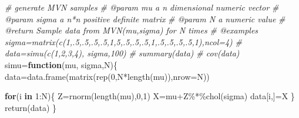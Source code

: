 \documentclass[
]{article}
\newenvironment{Shaded}{\begin{snugshade}}{\end{snugshade}}
\newcommand{\AttributeTok}[1]{\textcolor[rgb]{0.77,0.63,0.00}{#1}}
\newcommand{\CommentTok}[1]{\textcolor[rgb]{0.56,0.35,0.01}{\textit{#1}}}
\newcommand{\ControlFlowTok}[1]{\textcolor[rgb]{0.13,0.29,0.53}{\textbf{#1}}}
\newcommand{\DecValTok}[1]{\textcolor[rgb]{0.00,0.00,0.81}{#1}}
\newcommand{\FunctionTok}[1]{\textcolor[rgb]{0.00,0.00,0.00}{#1}}
\newcommand{\NormalTok}[1]{#1}
\newcommand{\OtherTok}[1]{\textcolor[rgb]{0.56,0.35,0.01}{#1}}
\newcommand{\SpecialCharTok}[1]{\textcolor[rgb]{0.00,0.00,0.00}{#1}}
\begin{document}
\begin{Shaded}
\begin{Highlighting}[]
\CommentTok{\#\textquotesingle{} generate MVN samples}
\CommentTok{\#\textquotesingle{} @param mu a n dimensional numeric vector}
\CommentTok{\#\textquotesingle{} @param sigma a n*n positive definite matrix}
\CommentTok{\#\textquotesingle{} @param N a numeric value}
\CommentTok{\#\textquotesingle{} @return Sample data from MVN(mu,sigma) for N times}
\CommentTok{\#\textquotesingle{} @examples sigma=matrix(c(1,.5,.5,.5,.5,1,5,.5,.5,.5,1,.5,.5,.5,.5,1),ncol=4)}
\CommentTok{\#\textquotesingle{} data=simu(c(1,2,3,4), sigma,100)}
\CommentTok{\#\textquotesingle{} summary(data)}
\CommentTok{\#\textquotesingle{} cov(data)}
\NormalTok{simu}\OtherTok{=}\ControlFlowTok{function}\NormalTok{(mu, sigma,N)\{}
\NormalTok{  data}\OtherTok{=}\FunctionTok{data.frame}\NormalTok{(}\FunctionTok{matrix}\NormalTok{(}\FunctionTok{rep}\NormalTok{(}\DecValTok{0}\NormalTok{,N}\SpecialCharTok{*}\FunctionTok{length}\NormalTok{(mu)),}\AttributeTok{nrow=}\NormalTok{N))}

  \ControlFlowTok{for}\NormalTok{(i }\ControlFlowTok{in} \DecValTok{1}\SpecialCharTok{:}\NormalTok{N)\{}
\NormalTok{    Z}\OtherTok{=}\FunctionTok{rnorm}\NormalTok{(}\FunctionTok{length}\NormalTok{(mu),}\DecValTok{0}\NormalTok{,}\DecValTok{1}\NormalTok{)}
\NormalTok{    X}\OtherTok{=}\NormalTok{mu}\SpecialCharTok{+}\NormalTok{Z}\SpecialCharTok{\%*\%}\FunctionTok{chol}\NormalTok{(sigma)}
\NormalTok{    data[i,]}\OtherTok{=}\NormalTok{X}
\NormalTok{  \}}
  \FunctionTok{return}\NormalTok{(data)}
\NormalTok{\}}


\end{Highlighting}
\end{Shaded}
\end{document}
